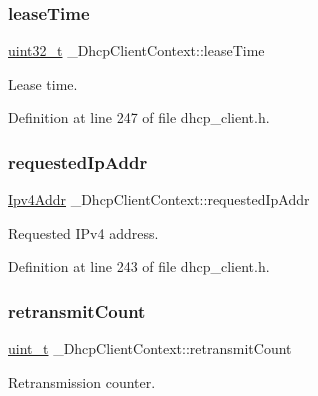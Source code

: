 \subsubsection{\texorpdfstring{lease\+Time}{leaseTime}}
{\footnotesize\ttfamily \hyperlink{stdint_8h_a435d1572bf3f880d55459d9805097f62}{uint32\+\_\+t} \+\_\+\+Dhcp\+Client\+Context\+::lease\+Time}



Lease time. 



Definition at line 247 of file dhcp\+\_\+client.\+h.

\mbox{\label{struct__DhcpClientContext_a397b23a0a96d869807dd6fd13c236672}} 
\subsubsection{\texorpdfstring{requested\+Ip\+Addr}{requestedIpAddr}}
{\footnotesize\ttfamily \hyperlink{ipv4_8h_a411debb3d770caa0c06d3f73367da37f}{Ipv4\+Addr} \+\_\+\+Dhcp\+Client\+Context\+::requested\+Ip\+Addr}



Requested I\+Pv4 address. 



Definition at line 243 of file dhcp\+\_\+client.\+h.

\mbox{\label{struct__DhcpClientContext_aae9928c7c0256e4d785521940626b7ad}} 
\subsubsection{\texorpdfstring{retransmit\+Count}{retransmitCount}}
{\footnotesize\ttfamily \hyperlink{compiler__port_8h_a12a1e9b3ce141648783a82445d02b58d}{uint\+\_\+t} \+\_\+\+Dhcp\+Client\+Context\+::retransmit\+Count}



Retransmission counter. 



